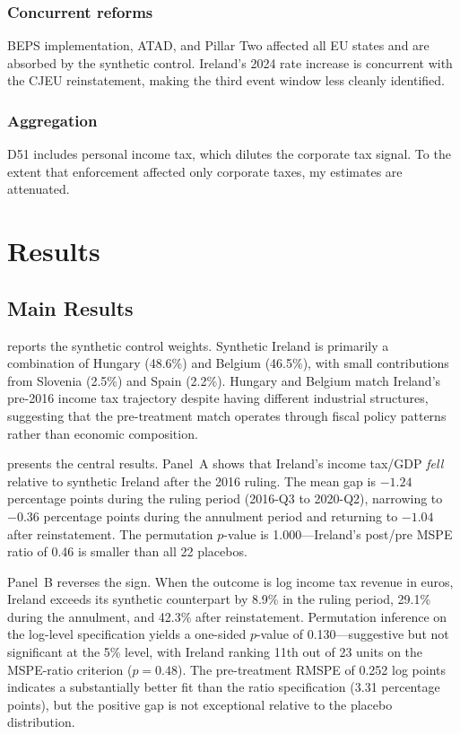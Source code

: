 \documentclass[12pt]{article}
\begin{document}
\subsubsection*{Concurrent reforms} BEPS implementation, ATAD, and Pillar Two affected all EU states and are absorbed by the synthetic control. Ireland's 2024 rate increase is concurrent with the CJEU reinstatement, making the third event window less cleanly identified.

\subsubsection*{Aggregation} D51 includes personal income tax, which dilutes the corporate tax signal. To the extent that enforcement affected only corporate taxes, my estimates are attenuated.

\section{Results}

\subsection{Main Results}



 reports the synthetic control weights. Synthetic Ireland is primarily a combination of Hungary (48.6\%) and Belgium (46.5\%), with small contributions from Slovenia (2.5\%) and Spain (2.2\%). Hungary and Belgium match Ireland's pre-2016 income tax trajectory despite having different industrial structures, suggesting that the pre-treatment match operates through fiscal policy patterns rather than economic composition.



 presents the central results. Panel~A shows that Ireland's income tax/GDP \textit{fell} relative to synthetic Ireland after the 2016 ruling. The mean gap is $-1.24$ percentage points during the ruling period (2016-Q3 to 2020-Q2), narrowing to $-0.36$ percentage points during the annulment period and returning to $-1.04$ after reinstatement. The permutation $p$-value is 1.000---Ireland's post/pre MSPE ratio of 0.46 is smaller than all 22 placebos.

Panel~B reverses the sign. When the outcome is log income tax revenue in euros, Ireland exceeds its synthetic counterpart by 8.9\% in the ruling period, 29.1\% during the annulment, and 42.3\% after reinstatement. Permutation inference on the log-level specification yields a one-sided $p$-value of 0.130---suggestive but not significant at the 5\% level, with Ireland ranking 11th out of 23 units on the MSPE-ratio criterion ($p = 0.48$). The pre-treatment RMSPE of 0.252 log points indicates a substantially better fit than the ratio specification (3.31 percentage points), but the positive gap is not exceptional relative to the placebo distribution.
\end{document}

